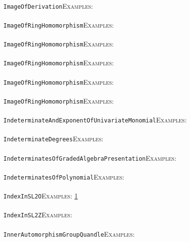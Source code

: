 \documentclass[a4paper,11pt]{report}
\begin{document}
{{ \\
 \texttt{ImageOfDerivation}{\nobreakspace}{\nobreakspace}{\nobreakspace}{\nobreakspace}\textsc{Examples:} \\
 \\
 \texttt{ImageOfRingHomomorphism}{\nobreakspace}{\nobreakspace}{\nobreakspace}{\nobreakspace}\textsc{Examples:} \\
 \\
 \texttt{ImageOfRingHomomorphism}{\nobreakspace}{\nobreakspace}{\nobreakspace}{\nobreakspace}\textsc{Examples:} \\
 \\
 \texttt{ImageOfRingHomomorphism}{\nobreakspace}{\nobreakspace}{\nobreakspace}{\nobreakspace}\textsc{Examples:} \\
 \\
 \texttt{ImageOfRingHomomorphism}{\nobreakspace}{\nobreakspace}{\nobreakspace}{\nobreakspace}\textsc{Examples:} \\
 \\
 \texttt{ImageOfRingHomomorphism}{\nobreakspace}{\nobreakspace}{\nobreakspace}{\nobreakspace}\textsc{Examples:} \\
 \\
 \texttt{IndeterminateAndExponentOfUnivariateMonomial}{\nobreakspace}{\nobreakspace}{\nobreakspace}{\nobreakspace}\textsc{Examples:} \\
 \\
 \texttt{IndeterminateDegrees}{\nobreakspace}{\nobreakspace}{\nobreakspace}{\nobreakspace}\textsc{Examples:} \\
 \\
 \texttt{IndeterminatesOfGradedAlgebraPresentation}{\nobreakspace}{\nobreakspace}{\nobreakspace}{\nobreakspace}\textsc{Examples:} \\
 \\
 \texttt{IndeterminatesOfPolynomial}{\nobreakspace}{\nobreakspace}{\nobreakspace}{\nobreakspace}\textsc{Examples:} \\
 \\
 \texttt{IndexInSL2O}{\nobreakspace}{\nobreakspace}{\nobreakspace}{\nobreakspace}\textsc{Examples:} \href{tutorial/chap10.html} {1}{\nobreakspace} \\
 \\
 \texttt{IndexInSL2Z}{\nobreakspace}{\nobreakspace}{\nobreakspace}{\nobreakspace}\textsc{Examples:} \\
 \\
 \texttt{InnerAutomorphismGroupQuandle}{\nobreakspace}{\nobreakspace}{\nobreakspace}{\nobreakspace}\textsc{Examples:} \\
}}
\end{document}
